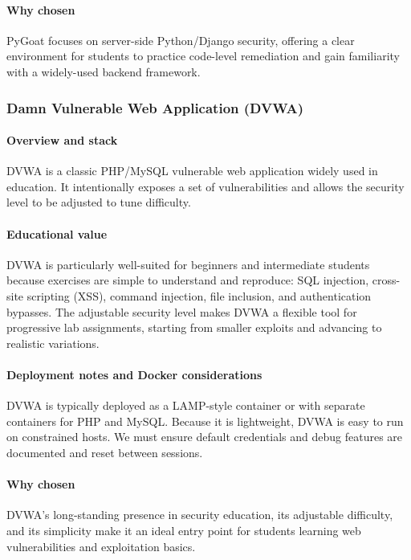 \documentclass[12pt]{article}
\begin{document}
\paragraph{Why chosen}
PyGoat focuses on server-side Python/Django security, offering a clear environment for students to practice code-level remediation and gain familiarity with a widely-used backend framework.


\subsubsection{Damn Vulnerable Web Application (DVWA)}
\paragraph{Overview and stack}
DVWA is a classic PHP/MySQL vulnerable web application widely used in education. It intentionally exposes a set of vulnerabilities and allows the security level to be adjusted to tune difficulty.

\paragraph{Educational value}
DVWA is particularly well-suited for beginners and intermediate students because exercises are simple to understand and reproduce: SQL injection, cross-site scripting (XSS), command injection, file inclusion, and authentication bypasses. The adjustable security level makes DVWA a flexible tool for progressive lab assignments, starting from smaller exploits and advancing to realistic variations.

\paragraph{Deployment notes and Docker considerations}
DVWA is typically deployed as a LAMP-style container or with separate containers for PHP and MySQL. Because it is lightweight, DVWA is easy to run on constrained hosts. We must ensure default credentials and debug features are documented and reset between sessions.

\paragraph{Why chosen}
DVWA’s long-standing presence in security education, its adjustable difficulty, and its simplicity make it an ideal entry point for students learning web vulnerabilities and exploitation basics.
\end{document}
